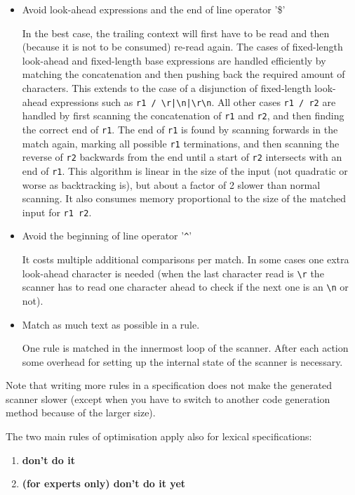 \documentclass[11pt]{scrartcl}
\begin{document}
\begin{itemize}
\item
  Avoid look-ahead expressions and the end of line operator '\$'

  In the best case, the trailing context will first have to be read and 
  then (because it is not to be consumed) re-read again. The cases of 
  fixed-length look-ahead and fixed-length base expressions are handled efficiently
  by matching the concatenation and then pushing back the required amount
  of characters. This extends to the case of a disjunction of fixed-length
  look-ahead expressions such as \verb+r1 / \r|\n|\r\n+. All other cases
  \verb+r1 / r2+ are handled by first scanning the concatenation of 
  \verb+r1+ and \verb+r2+, and then finding the correct end of \verb+r1+. 
  The end of \verb+r1+ is found by scanning forwards in the match again,
  marking all possible \verb+r1+ terminations, and then scanning the reverse
  of \verb+r2+ backwards from the end until a start of \verb+r2+ intersects
  with an end of \verb+r1+. This algorithm is linear in the size of the input
  (not quadratic or worse as backtracking is), but about a factor of 2 slower 
  than normal scanning. It also consumes memory proportional to the size
  of the matched input for \verb+r1 r2+. 

\item
  Avoid the beginning of line operator '\verb+^+'
  
  It costs multiple additional comparisons per match. In some
  cases one extra look-ahead character is needed (when the last character read is
  \verb+\r+ the scanner has to read one character ahead to check if
  the next one is an \verb+\n+ or not).

\item
  Match as much text as possible in a rule.
  
  One rule is matched in the innermost loop of the scanner.  After
  each action some overhead for setting up the internal state of the
   scanner is necessary.
\end{itemize}

Note that writing more rules in a specification does not make the generated
scanner slower (except when you have to switch to another code generation
method because of the larger size).

The two main rules of optimisation apply also for lexical specifications:
\begin{enumerate}
\item {\bf don't do it}
\item {\bf (for experts only) don't do it yet}
\end{enumerate}
\end{document}
